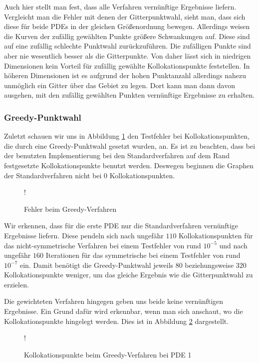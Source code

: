 Auch hier stellt man fest, dass alle Verfahren vernünftige Ergebnisse liefern. Vergleicht man die Fehler mit denen der Gitterpunktwahl, sieht man, dass sich diese für beide \acp{PDE} in der gleichen Größenordnung bewegen. Allerdings weisen die Kurven der zufällig gewählten Punkte größere Schwankungen auf. Diese sind auf eine zufällig schlechte Punktwahl zurückzuführen. Die zufälligen Punkte sind aber nie wesentlich besser als die Gitterpunkte. Von daher lässt sich in niedrigen Dimensionen kein Vorteil für zufällig gewählte Kollokationspunkte feststellen. In höheren Dimensionen ist es aufgrund der hohen Punktanzahl allerdings nahezu unmöglich ein Gitter über das Gebiet zu legen. Dort kann man dann davon ausgehen, mit den zufällig gewählten Punkten vernünftige Ergebnisse zu erhalten.

\subsubsection{Greedy-Punktwahl}
Zuletzt schauen wir uns in Abbildung \ref{fig:error-greedy} den Testfehler bei Kollokationspunkten, die durch eine Greedy-Punktwahl gesetzt wurden, an. Es ist zu beachten, dass bei der benutzten Implementierung bei den Standardverfahren auf dem Rand festgesetzte Kollokationspunkte benutzt werden. Deswegen beginnen die Graphen der Standardverfahren nicht bei $0$ Kollokationspunkten.
\begin{figure}[ht]
\centering
\resizebox {\columnwidth} {!} {

}
\caption{Fehler beim Greedy-Verfahren}
\label{fig:error-greedy}
\end{figure}

Wir erkennen, dass für die erste \ac{PDE} nur die Standardverfahren vernünftige Ergebnisse liefern. Diese pendeln sich nach ungefähr $110$ Kollokationspunkten für das nicht-symmetrische Verfahren bei einem Testfehler von rund $10^{-5}$ und nach ungefähr $160$ Iterationen für das symmetrische bei einem Testfehler von rund $10^{-7}$ ein. Damit benötigt die Greedy-Punktwahl jeweils $80$ beziehungsweise $320$ Kollokationspunkte weniger, um das gleiche Ergebnis wie die Gitterpunktwahl zu erzielen.

Die gewichteten Verfahren hingegen geben uns beide keine vernünftigen Ergebnisse. Ein Grund dafür wird erkennbar, wenn man sich anschaut, wo die Kollokationspunkte hingelegt werden. Dies ist in Abbildung \ref{fig:greedy-points} dargestellt.
\begin{figure}[ht]
\centering
\resizebox {\columnwidth} {!} {

}
\caption{Kollokationspunkte beim Greedy-Verfahren bei \ac{PDE} 1}
\label{fig:greedy-points}
\end{figure}

